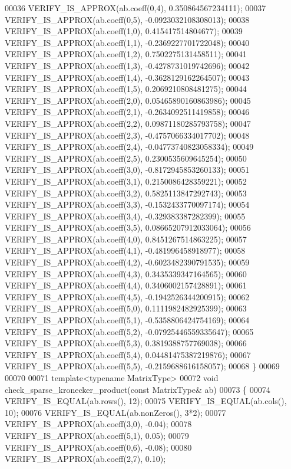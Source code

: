 \begin{DoxyCode}
00036   VERIFY\_IS\_APPROX(ab.coeff(0,4),  0.350864567234111);
00037   VERIFY\_IS\_APPROX(ab.coeff(0,5), -0.0923032108308013);
00038   VERIFY\_IS\_APPROX(ab.coeff(1,0),  0.415417514804677);
00039   VERIFY\_IS\_APPROX(ab.coeff(1,1), -0.2369227701722048);
00040   VERIFY\_IS\_APPROX(ab.coeff(1,2),  0.7502275131458511);
00041   VERIFY\_IS\_APPROX(ab.coeff(1,3), -0.4278731019742696);
00042   VERIFY\_IS\_APPROX(ab.coeff(1,4), -0.3628129162264507);
00043   VERIFY\_IS\_APPROX(ab.coeff(1,5),  0.2069210808481275);
00044   VERIFY\_IS\_APPROX(ab.coeff(2,0),  0.05465890160863986);
00045   VERIFY\_IS\_APPROX(ab.coeff(2,1), -0.2634092511419858);
00046   VERIFY\_IS\_APPROX(ab.coeff(2,2),  0.09871180285793758);
00047   VERIFY\_IS\_APPROX(ab.coeff(2,3), -0.4757066334017702);
00048   VERIFY\_IS\_APPROX(ab.coeff(2,4), -0.04773740823058334);
00049   VERIFY\_IS\_APPROX(ab.coeff(2,5),  0.2300535609645254);
00050   VERIFY\_IS\_APPROX(ab.coeff(3,0), -0.8172945853260133);
00051   VERIFY\_IS\_APPROX(ab.coeff(3,1),  0.2150086428359221);
00052   VERIFY\_IS\_APPROX(ab.coeff(3,2),  0.5825113847292743);
00053   VERIFY\_IS\_APPROX(ab.coeff(3,3), -0.1532433770097174);
00054   VERIFY\_IS\_APPROX(ab.coeff(3,4), -0.329383387282399);
00055   VERIFY\_IS\_APPROX(ab.coeff(3,5),  0.08665207912033064);
00056   VERIFY\_IS\_APPROX(ab.coeff(4,0),  0.8451267514863225);
00057   VERIFY\_IS\_APPROX(ab.coeff(4,1), -0.481996458918977);
00058   VERIFY\_IS\_APPROX(ab.coeff(4,2), -0.6023482390791535);
00059   VERIFY\_IS\_APPROX(ab.coeff(4,3),  0.3435339347164565);
00060   VERIFY\_IS\_APPROX(ab.coeff(4,4),  0.3406002157428891);
00061   VERIFY\_IS\_APPROX(ab.coeff(4,5), -0.1942526344200915);
00062   VERIFY\_IS\_APPROX(ab.coeff(5,0),  0.1111982482925399);
00063   VERIFY\_IS\_APPROX(ab.coeff(5,1), -0.5358806424754169);
00064   VERIFY\_IS\_APPROX(ab.coeff(5,2), -0.07925446559335647);
00065   VERIFY\_IS\_APPROX(ab.coeff(5,3),  0.3819388757769038);
00066   VERIFY\_IS\_APPROX(ab.coeff(5,4),  0.04481475387219876);
00067   VERIFY\_IS\_APPROX(ab.coeff(5,5), -0.2159688616158057);
00068 \}
00069 
00070 
00071 \textcolor{keyword}{template}<\textcolor{keyword}{typename} MatrixType>
00072 \textcolor{keywordtype}{void} check\_sparse\_kronecker\_product(\textcolor{keyword}{const} MatrixType& ab)
00073 \{
00074   VERIFY\_IS\_EQUAL(ab.rows(), 12);
00075   VERIFY\_IS\_EQUAL(ab.cols(), 10);
00076   VERIFY\_IS\_EQUAL(ab.nonZeros(), 3*2);
00077   VERIFY\_IS\_APPROX(ab.coeff(3,0), -0.04);
00078   VERIFY\_IS\_APPROX(ab.coeff(5,1),  0.05);
00079   VERIFY\_IS\_APPROX(ab.coeff(0,6), -0.08);
00080   VERIFY\_IS\_APPROX(ab.coeff(2,7),  0.10);

\end{DoxyCode}
